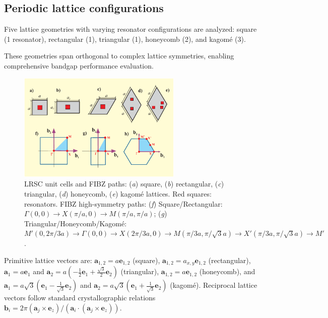 \documentclass[review,numbers,sort&compress]{elsarticle}
\begin{document}
\subsection{Periodic lattice configurations}\label{lattice_configurations}

Five lattice geometries with varying resonator configurations are analyzed: square (1 resonator), rectangular (1), triangular (1), honeycomb (2), and kagomé (3). 

\newpage
These geometries span orthogonal to complex lattice symmetries, enabling comprehensive bandgap performance evaluation.

\begin{figure}[htb]
	\centering
	\includegraphics[width=0.7\textwidth]{ilustr_unit_cell_type_lattice.pdf}
\caption{LRSC unit cells and FIBZ paths: (\textit{a}) square, (\textit{b}) rectangular, (\textit{c}) triangular, (\textit{d}) honeycomb, (\textit{e}) kagomé lattices. Red squares: resonators. FIBZ high-symmetry paths: (\textit{f}) Square/Rectangular: $\Gamma(0,0) \to X(\pi/a,0) \to M(\pi/a,\pi/a)$; (\textit{g}) Triangular/Honeycomb/Kagomé: $M'(0,2\pi/3a) \to \Gamma(0,0) \to X(2\pi/3a,0) \to M(\pi/3a,\pi/\sqrt{3}a) \to X'(\pi/3a,\pi/\sqrt{3}a) \to M'$.}
	\label{ilustr_unit_cell_type_lattice}
\end{figure}

Primitive lattice vectors are: $\mathbf{a}_{1,2} = a\mathbf{e}_{1,2}$ (square), $\mathbf{a}_{1,2} = a_{x,y}\mathbf{e}_{1,2}$ (rectangular), $\mathbf{a}_1 = a\mathbf{e}_1$ and $\mathbf{a}_2 = a(-\frac{1}{2}\mathbf{e}_1 + \frac{\sqrt{3}}{2}\mathbf{e}_2)$ (triangular), $\mathbf{a}_{1,2} = a\mathbf{e}_{1,2}$ (honeycomb), and $\mathbf{a}_1 = a\sqrt{3}(\mathbf{e}_1 - \frac{1}{\sqrt{3}}\mathbf{e}_2)$ and $\mathbf{a}_2 = a\sqrt{3}(\mathbf{e}_1 + \frac{1}{\sqrt{3}}\mathbf{e}_2)$ (kagomé). Reciprocal lattice vectors follow standard crystallographic relations $\mathbf{b}_i = 2\pi(\mathbf{a}_j \times \mathbf{e}_z)/(\mathbf{a}_i \cdot (\mathbf{a}_j \times \mathbf{e}_z))$.
\end{document}
